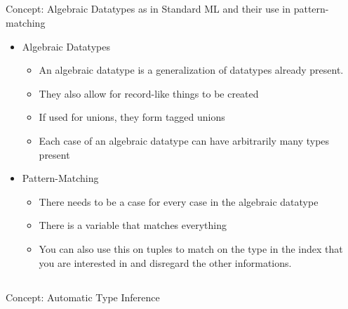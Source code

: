 \subsection{}
Concept: Algebraic Datatypes as in Standard ML and their use in pattern-matching

\begin{itemize}
\item Algebraic Datatypes
  \begin{itemize}[noitemsep]
  \item An algebraic datatype is a generalization of datatypes already present.
  \item They also allow for record-like things to be created
  \item If used for unions, they form tagged unions
  \item Each case of an algebraic datatype can have arbitrarily many types present
  \end{itemize}

\item Pattern-Matching
  \begin{itemize}[noitemsep]
  \item There needs to be a case for every case in the algebraic datatype
  \item There is a variable \texttt{\textunderscore{}} that matches everything
  \item You can also use this on tuples to match on the type in the index that you are interested in and disregard the other informations.
  \end{itemize}
\end{itemize}

\subsection{}
Concept: Automatic Type Inference

